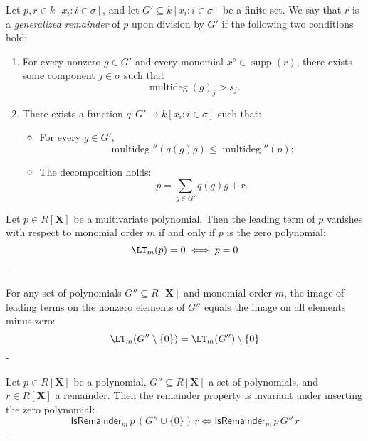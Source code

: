 \begin{lemma}\label{MonomialOrder.IsRemainder_def''}
  \leanok
  Let \( p, r \in k[x_i : i \in \sigma] \), and let \( G' \subseteq k[x_i : i \in \sigma] \) be a finite set.
We say that \( r \) is a \emph{generalized remainder} of \( p \) upon division by \( G' \) if the following two conditions hold:

\begin{enumerate}
\item For every nonzero \( g \in G' \) and every monomial \( x^s \in \operatorname{supp}(r) \),
there exists some component \( j \in \sigma \) such that
\[
\operatorname{multideg}(g)_j > s_j.
\]
\item There exists a function \( q : G' \to k[x_i : i \in \sigma] \) such that:
\begin{itemize}
\item For every \( g \in G' \),
  \[
  \operatorname{multideg}''(q(g)g) \leq \operatorname{multideg}''(p);
  \]
\item The decomposition holds:
  \[
  p = \sum_{g \in G'} q(g)g + r.
  \]
\end{itemize}
\end{enumerate}

\end{lemma}

\begin{lemma}\label{MonomialOrder.lm_eq_zero_iff}
  \leanok
  Let $p \in R[\mathbf{X}]$ be a multivariate polynomial. Then the leading term of $p$
vanishes with respect to monomial order $m$ if and only if $p$ is the zero polynomial:
\[
\LT_m(p) = 0 \iff p = 0
\]
-
\end{lemma}

\begin{lemma}\label{MonomialOrder.leadingTerm_image_sdiff_singleton_zero}
  \leanok
  For any set of polynomials $G'' \subseteq R[\mathbf{X}]$ and monomial order $m$,
the image of leading terms on the nonzero elements of $G''$ equals the image on all
elements minus zero:
\[
\LT_m(G'' \setminus \{0\}) = \LT_m(G'') \setminus \{0\}
\]
-
\end{lemma}

\begin{lemma}\label{MonomialOrder.isRemainder_of_insert_zero_iff_isRemainder}
  \leanok
  Let $p \in R[\mathbf{X}]$ be a polynomial, $G'' \subseteq R[\mathbf{X}]$ a set of polynomials,
and $r \in R[\mathbf{X}]$ a remainder. Then the remainder property is invariant under
inserting the zero polynomial:
\[
\mathsf{IsRemainder}_m\,p\,(G'' \cup \{0\})\,r \iff \mathsf{IsRemainder}_m\,p\,G''\,r
\]
-
\end{lemma}

